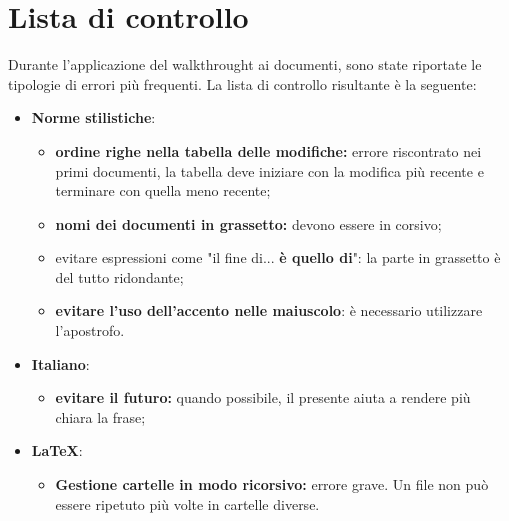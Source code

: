 \chapter{Lista di controllo}
\label{ListaControllo}
Durante l'applicazione del walkthrought ai documenti, sono state riportate le tipologie di errori più frequenti. La lista di controllo risultante è la seguente:
\begin{itemize}
	\item \textbf{Norme stilistiche}:
	\begin{itemize}
		\item \textbf{ordine righe nella tabella delle modifiche:} errore riscontrato nei primi documenti, la tabella deve iniziare con la modifica più recente e terminare con quella meno recente;
		\item \textbf{nomi dei documenti in grassetto:} devono essere in corsivo;
		\item evitare espressioni come "il fine di... \textbf{è quello di}": la parte in grassetto è del tutto ridondante;
		\item \textbf{evitare l'uso dell'accento nelle maiuscolo}: è necessario utilizzare l'apostrofo.
	\end{itemize}
	\item \textbf{Italiano}:
	\begin{itemize}
		\item \textbf{evitare il futuro:} quando possibile, il presente aiuta a rendere più chiara la frase;
	\end{itemize}
	\item \textbf{\LaTeX}:
	\begin{itemize}
		\item \textbf{Gestione cartelle in modo ricorsivo:} errore grave. Un file non può essere ripetuto più volte in cartelle diverse.
	\end{itemize}
\end{itemize}